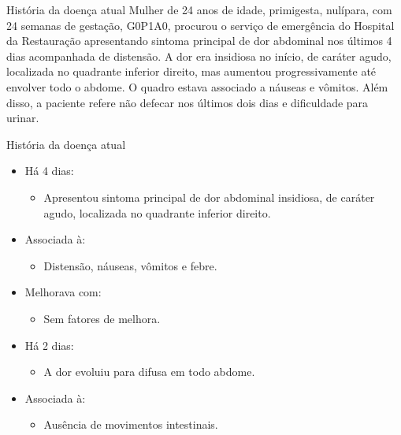 \begin{frame}{História da doença atual}
Mulher de 24 anos de idade, primigesta, nulípara, com 24 semanas de gestação, G0P1A0, procurou o serviço de emergência do Hospital da Restauração apresentando sintoma principal de dor abdominal nos últimos 4 dias acompanhada de distensão. A dor era insidiosa no início, de caráter agudo, localizada no quadrante inferior direito, mas aumentou progressivamente até envolver todo o abdome. O quadro estava associado a náuseas e vômitos. Além disso, a paciente refere não defecar nos últimos dois dias e dificuldade para urinar. 
\end{frame}

\begin{frame}{História da doença atual}
    \begin{itemize}
        \item Há 4 dias:
             \begin{itemize}
                 \item Apresentou sintoma principal de dor abdominal  insidiosa, de caráter agudo, localizada no quadrante inferior direito.
             \end{itemize}
        \item Associada à:
            \begin{itemize} 
                \item Distensão, náuseas, vômitos e febre.
            \end{itemize}
        \item Melhorava com:
            \begin{itemize} 
                \item Sem fatores de melhora.
            \end{itemize}
        \item Há 2 dias:
             \begin{itemize}
                 \item A dor evoluiu para difusa em todo abdome. 
             \end{itemize}
       \item Associada à:
         \begin{itemize}
             \item Ausência de movimentos intestinais.  
         \end{itemize}
    \end{itemize}
\end{frame}